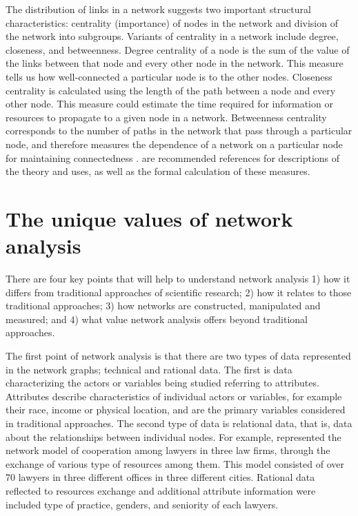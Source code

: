 The distribution of links in a network suggests two important structural characteristics: centrality (importance) of nodes in the network and division of the network into subgroups. Variants of centrality in a network include degree, closeness, and betweenness. Degree centrality of a node is the sum of the value of the links between that node and every other node in the network. This measure tells us how well-connected a particular node is to the other nodes. Closeness centrality is calculated using the length of the path between a node and every other node. This measure could estimate the time required for information or resources to propagate to a given node in a network. Betweenness centrality corresponds to the number of paths in the network that pass through a particular node, and therefore measures the dependence of a network on a particular node for maintaining connectedness \citep{Toubiana:2013cv}. \citet{Deng:2012do, newman2003structure, Toubiana:2013cv} are recommended references for descriptions of the theory and uses, as well as the formal calculation of these measures.


\section*{The unique values of network analysis}

There are four key points that will help to understand network analysis 1) how it differs from traditional approaches of scientific research; 2) how it relates to those traditional approaches; 3) how networks are constructed, manipulated and measured; and 4) what value network analysis offers beyond traditional approaches.

The first point of network analysis is that there are two types of data represented in the network graphs; technical and rational data. The first is data characterizing the actors or variables being studied referring to attributes. Attributes describe characteristics of individual actors or variables, for example their race, income or physical location, and are the primary variables considered in traditional approaches. The second type of data is relational data, that is, data about the relationships between individual nodes. For example, \citet{Lazega} represented the network model of cooperation among lawyers in three law firms, through the exchange of various type of resources among them. This model consisted of over 70 lawyers in three different offices in three different cities. Rational data reflected to resources exchange and additional attribute information were included type of practice, genders, and seniority of each lawyers.

